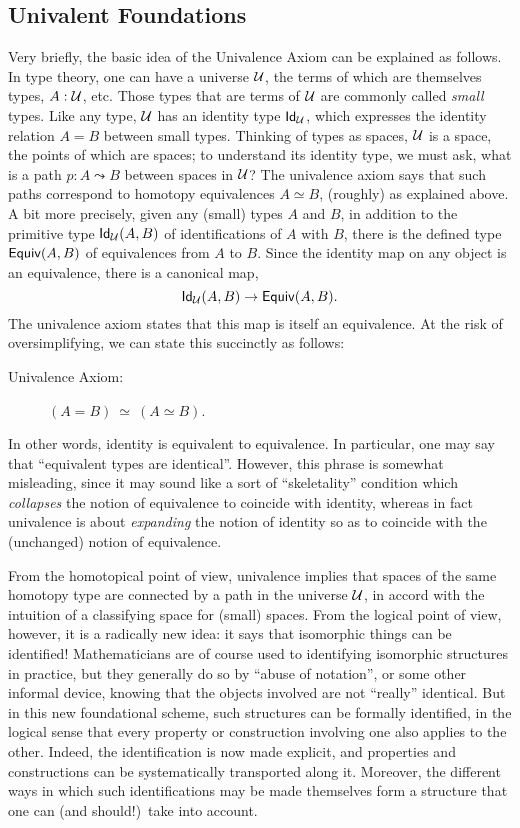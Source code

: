 \subsection*{Univalent Foundations}

Very briefly, the basic idea of the Univalence Axiom can be explained as follows.
In type theory, one can have a universe $\UU$, the terms of which are themselves types, $A : \UU$, etc.
Those types that are terms of $\UU$ are commonly called \emph{small} types.
Like any type, $\UU$ has an identity type $\idtypevar{\UU}$, which expresses the identity relation $A = B$ between small types.
Thinking of types as spaces, $\UU$ is a space, the points of which are spaces; to understand its identity type, we must ask, what is a path $p : A \leadsto B$ between spaces in $\UU$?
The univalence axiom says that such paths correspond to homotopy equivalences $A\simeq B$, (roughly) as explained above.
A bit more precisely, given any (small) types $A$ and $B$, in addition to the primitive type $\idtype[\UU]AB$ of identifications of $A$ with $B$, there is the defined type $\texteqv AB$ of equivalences from $A$ to $B$.
Since the identity map on any object is an equivalence, there is a canonical map,
\[\idtype[\UU]AB\to\texteqv AB.\]
The univalence axiom states that this map is itself an equivalence.
At the risk of oversimplifying, we can state this succinctly as follows:

\begin{description}
\item[Univalence Axiom:]  $(A = B)\ \simeq\ (A\simeq B)$.
\end{description}
%
In other words, identity is equivalent to equivalence. 
In particular, one may say that ``equivalent types are identical''.
However, this phrase is somewhat misleading, since it may sound like a sort of ``skeletality'' condition which \emph{collapses} the notion of equivalence to coincide with identity, whereas in fact univalence is about \emph{expanding} the notion of identity so as to coincide with the (unchanged) notion of equivalence.

From the homotopical point of view, univalence implies that spaces of the same homotopy type are connected by a path in the universe $\UU$, in accord with the intuition of a classifying space for (small) spaces.
From the logical point of view, however, it is a radically new idea: it says that isomorphic things can be identified!  Mathematicians are of course used to identifying isomorphic structures in practice, but they generally do so by ``abuse of notation'', or some other informal device, knowing that the objects involved are not ``really'' identical.  But in this new foundational scheme, such structures can be formally identified, in the logical sense that every property or construction involving one also applies to the other. Indeed, the identification is now made explicit, and properties and constructions can be systematically transported along it.  Moreover, the different ways in which such identifications may be made themselves form a structure that one can (and should!)\ take into account.

